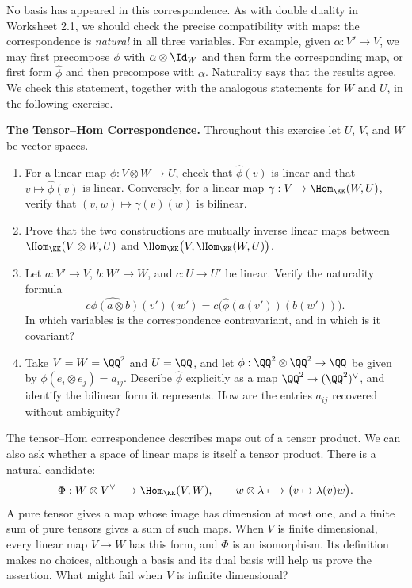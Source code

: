 \documentclass[12pt,reqno]{amsart}
\begin{document}
No basis has appeared in this correspondence. As with double duality in Worksheet 2.1, we should check the precise compatibility with maps: the correspondence is \emph{natural} in all three variables. For example, given $\alpha:V'\to V$, we may first precompose $\phi$ with $\alpha\otimes\Id_W$ and then form the corresponding map, or first form $\widehat\phi$ and then precompose with $\alpha$. Naturality says that the results agree. We check this statement, together with the analogous statements for $W$ and $U$, in the following exercise.

\hrulefill

\begin{problems}
\item\label{t:adjunction} \textbf{The Tensor--Hom Correspondence.} Throughout this exercise let $U$, $V$, and $W$ be vector spaces.
\begin{enumerate}
\item For a linear map $\phi:V\otimes W\to U$, check that $\widehat\phi(v)$ is linear and that $v\mapsto\widehat\phi(v)$ is linear. Conversely, for a linear map $\gamma:V\to\Hom_{\KK}(W,U)$, verify that $(v,w)\mapsto\gamma(v)(w)$ is bilinear.
\item Prove that the two constructions are mutually inverse linear maps between $\Hom_{\KK}(V\otimes W,U)$ and $\Hom_{\KK}\big(V,\Hom_{\KK}(W,U)\big)$.
\item Let $a:V'\to V$, $b:W'\to W$, and $c:U\to U'$ be linear. Verify the naturality formula
\[
\widehat{c\phi(a\otimes b)}(v')(w')
=c\big(\widehat\phi(a(v'))(b(w'))\big).
\]
In which variables is the correspondence contravariant, and in which is it covariant?
\item Take $V=W=\QQ^2$ and $U=\QQ$, and let $\phi:\QQ^2\otimes\QQ^2\to\QQ$ be given by $\phi(e_i\otimes e_j)=a_{ij}$. Describe $\widehat\phi$ explicitly as a map $\QQ^2\to(\QQ^2)^{\vee}$, and identify the bilinear form it represents. How are the entries $a_{ij}$ recovered without ambiguity?
\end{enumerate}
\end{problems}

\hrulefill

The tensor--Hom correspondence describes maps out of a tensor product. We can also ask whether a space of linear maps is itself a tensor product. There is a natural candidate:
\[
\Phi:W\otimes V^{\vee}\longrightarrow\Hom_{\KK}(V,W),\qquad
w\otimes\lambda\longmapsto\big(v\mapsto\lambda(v)w\big).
\]
A pure tensor gives a map whose image has dimension at most one, and a finite sum of pure tensors gives a sum of such maps. When $V$ is finite dimensional, every linear map $V\to W$ has this form, and $\Phi$ is an isomorphism. Its definition makes no choices, although a basis and its dual basis will help us prove the assertion. What might fail when $V$ is infinite dimensional?
\end{document}

